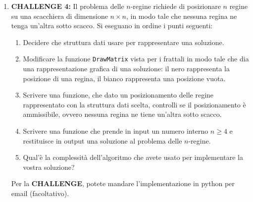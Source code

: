 \documentclass[11pt,a4]{article}
\begin{document}
\begin{enumerate}
\item {\bf CHALLENGE 4:} Il problema delle $n$-regine richiede di posizionare $n$ regine su una scacchiera
di dimensione $n \times n$, in modo tale che nessuna regina ne tenga un'altra sotto scacco. Si eseguano in ordine 
i punti seguenti:
\begin{enumerate}
\item Decidere che struttura dati usare per rappresentare una soluzione.
\item Modificare la funzione {\tt DrawMatrix} vista per i frattali in modo tale che dia una rappresentazione grafica di una soluzione: il nero rappresenta la posizione di una regina, il bianco rappresenta una posizione vuota.
\item Scrivere una funzione, che dato un posizionamento delle regine rappresentato con la struttura dati scelta,
controlli se il posizionamento è ammissibile, ovvero nessuna regina ne tiene un'altra sotto scacco.
\item Scrivere una funzione che prende in input un numero interno $n \geq 4$ e restituisce in output una soluzione al problema
delle $n$-regine.
\item Qual'è la complessità dell'algoritmo che avete usato per implementare la vostra soluzione?
\end{enumerate}

Per la {\bf CHALLENGE}, potete mandare l'implementazione in python per email (facoltativo).
\end{enumerate}
\end{document}
